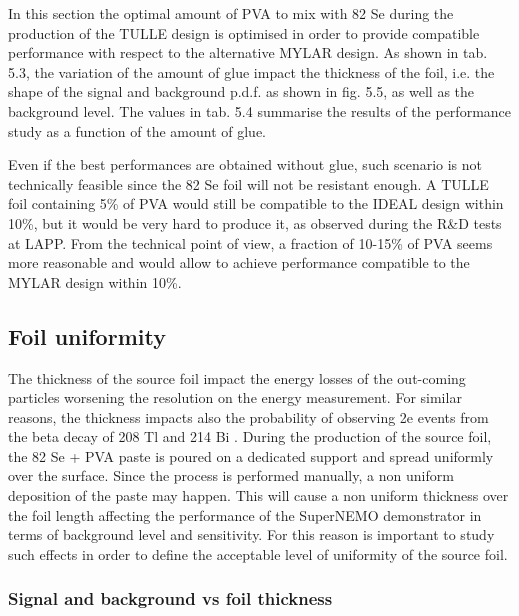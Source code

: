 \documentclass[main.tex]{subfiles}
\begin{document}
\NI In this section the optimal amount of PVA to mix with 82 Se during the production of the TULLE design is optimised in order to provide compatible performance with respect to the alternative MYLAR design. As shown in tab. 5.3, the variation of the amount of glue impact the thickness of the foil, i.e. the shape of the signal and background p.d.f. as shown in fig. 5.5, as well as the background level. The values in tab. 5.4 summarise the results of the performance study as a function of the amount of glue.


\bigskip


\NI Even if the best performances are obtained without glue, such scenario is not technically feasible since the 82 Se foil will not be resistant enough. A TULLE foil containing 5\% of PVA would still be compatible to the IDEAL design within 10\%, but it would be very hard to produce it, as observed during the R\&D tests at LAPP. From the technical point of view, a fraction of 10-15\% of PVA seems more reasonable and would allow to achieve performance compatible to the MYLAR design within 10\%.


\subsection{Foil uniformity}


\NI The thickness of the source foil impact the energy losses of the out-coming particles worsening the resolution on the energy measurement. For similar reasons, the thickness impacts also the probability of observing 2e events from the beta decay of 208 Tl and 214 Bi . During the production of the source foil, the 82 Se + PVA paste is poured on a dedicated support and spread uniformly over the surface. Since the process is performed manually, a non uniform deposition of the paste may happen. This will cause a non uniform thickness over the foil length affecting the performance of the SuperNEMO demonstrator in terms of background level and sensitivity. For this reason is important to study such effects in order to define the acceptable level of uniformity of the source foil.


\subsubsection{Signal and background vs foil thickness}
\end{document}
